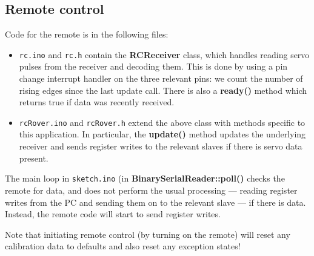 \subsection{Remote control}
Code for the remote is in the following files:
\begin{itemize}
\item \texttt{rc.ino} and \texttt{rc.h} contain the \textbf{RCReceiver} class,
which handles reading servo pulses from the receiver and decoding them.
This is done by using a pin change interrupt handler on the three relevant pins:
we count the number of rising edges since the last update call. There
is also a \textbf{ready()} method which returns true if data was recently
received.
\item \texttt{rcRover.ino} and \texttt{rcRover.h} extend the above class
with methods specific to this application. In particular, the \textbf{update()} method
updates the underlying receiver and sends register writes to the relevant slaves
if there is servo data present.
\end{itemize}
The main loop in \texttt{sketch.ino} (in \textbf{BinarySerialReader::poll()} checks the remote for data, and does
not perform the usual processing --- reading register writes from the PC and
sending them on to the relevant slave --- if there is data. Instead, the 
remote code will start to send register writes.

Note that initiating remote control (by turning on the remote) will
reset any calibration data to defaults and also reset any exception states!
